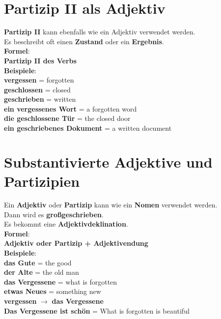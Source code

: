 \documentclass[a4paper]{article}
\begin{document}
    \section{Partizip II als Adjektiv}
        \textbf{Partizip II} kann ebenfalls wie ein Adjektiv verwendet werden.\\
        Es beschreibt oft einen \textbf{Zustand} oder ein \textbf{Ergebnis}.\\
        \textbf{Formel}:\\
        \textbf{Partizip II des Verbs}\\
        \textbf{Beispiele}:\\
        \textbf{vergessen} = forgotten\\
        \textbf{geschlossen} = closed\\
        \textbf{geschrieben} = written\\
        \textbf{ein vergessenes Wort} = a forgotten word\\
        \textbf{die geschlossene T\"ur} = the closed door\\
        \textbf{ein geschriebenes Dokument} = a written document\\
    
    
    \section{Substantivierte Adjektive und Partizipien}
        Ein \textbf{Adjektiv} oder \textbf{Partizip} kann wie ein \textbf{Nomen} verwendet werden.\\
        Dann wird es \textbf{gro\ss geschrieben}.\\
        Es bekommt eine \textbf{Adjektivdeklination}.\\
        \textbf{Formel}:\\
        \textbf{Adjektiv oder Partizip + Adjektivendung}\\
        \textbf{Beispiele}:\\
        \textbf{das Gute} = the good\\
        \textbf{der Alte} = the old man\\
        \textbf{das Vergessene} = what is forgotten\\
        \textbf{etwas Neues} = something new\\
        \textbf{vergessen} $\rightarrow$ \textbf{das Vergessene}\\
        \textbf{Das Vergessene ist sch\"on} = What is forgotten is beautiful\\
    
\end{document}
